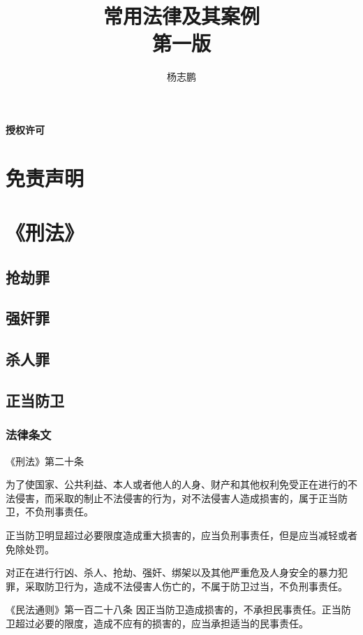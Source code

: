 \documentclass[UTF8]{ctexart}
\title{常用法律及其案例\\\normalsize{第一版}}
\author{杨志鹏}
\begin{document}
\maketitle
\thispagestyle{empty}
\newpage{}
\tableofcontents
\thispagestyle{empty}
\newpage{}
\pagestyle{fancy}
\paragraph{授权许可}
\section{免责声明}
\section{《刑法》}
\subsection{抢劫罪}
\subsection{强奸罪}
\subsection{杀人罪}
\subsection{正当防卫}
\subsubsection{法律条文}
《刑法》第二十条

为了使国家、公共利益、本人或者他人的人身、财产和其他权利免受正在进行的不法侵害，而采取的制止不法侵害的行为，对不法侵害人造成损害的，属于正当防卫，不负刑事责任。

正当防卫明显超过必要限度造成重大损害的，应当负刑事责任，但是应当减轻或者免除处罚。

对正在进行行凶、杀人、抢劫、强奸、绑架以及其他严重危及人身安全的暴力犯罪，采取防卫行为，造成不法侵害人伤亡的，不属于防卫过当，不负刑事责任。

《民法通则》第一百二十八条
因正当防卫造成损害的，不承担民事责任。正当防卫超过必要的限度，造成不应有的损害的，应当承担适当的民事责任。
\end{document}
